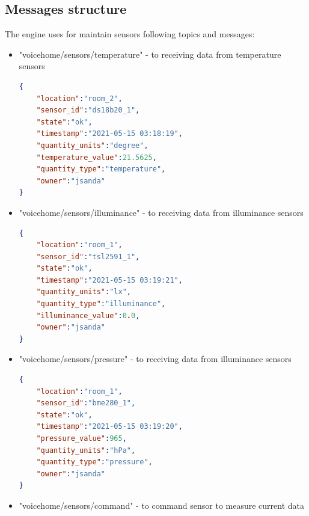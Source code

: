 \subsection{Messages structure}

The engine uses for maintain sensors following topics and messages:

\begin{itemize}
    \item "voicehome/sensors/temperature" - to receiving data from temperature sensors
    \begin{lstlisting}[language=json,firstnumber=1,caption={Structure of JSON message for receiving data from temperature sensors in module \textit{Sensors}},captionpos=b,xleftmargin=1cm]
{
    "location":"room_2",
    "sensor_id":"ds18b20_1",
    "state":"ok",
    "timestamp":"2021-05-15 03:18:19",
    "quantity_units":"degree",
    "temperature_value":21.5625,
    "quantity_type":"temperature",
    "owner":"jsanda"
}
    \end{lstlisting}
    \item "voicehome/sensors/illuminance" - to receiving data from illuminance sensors
    \begin{lstlisting}[language=json,firstnumber=1,caption={Structure of JSON message for receiving data from illuminance sensors in module \textit{Sensors}},captionpos=b,xleftmargin=1cm]
{
    "location":"room_1",
    "sensor_id":"tsl2591_1",
    "state":"ok",
    "timestamp":"2021-05-15 03:19:21",
    "quantity_units":"lx",
    "quantity_type":"illuminance",
    "illuminance_value":0.0,
    "owner":"jsanda"
}
    \end{lstlisting}
    \item "voicehome/sensors/pressure" - to receiving data from illuminance sensors
    \begin{lstlisting}[language=json,firstnumber=1,caption={Structure of JSON message for receiving data from pressure sensors in module \textit{Sensors}},captionpos=b,xleftmargin=1cm]
{
    "location":"room_1",
    "sensor_id":"bme280_1",
    "state":"ok",
    "timestamp":"2021-05-15 03:19:20",
    "pressure_value":965,
    "quantity_units":"hPa",
    "quantity_type":"pressure",
    "owner":"jsanda"
}
    \end{lstlisting}
    \item "voicehome/sensors/command" - to command sensor to measure current data
    \begin{lstlisting}[language=json,firstnumber=1,caption={Structure of JSON message to command sensor to measure current data in module \textit{Sensors}},captionpos=b,xleftmargin=1cm]

\end{lstlisting}
\end{itemize}

